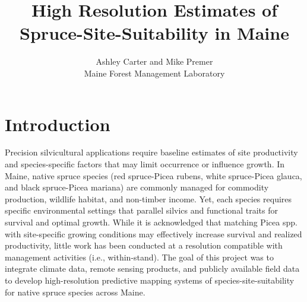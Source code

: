 \documentclass[9pt, twocolumn]{article}
\begin{document}
	\title{High Resolution Estimates of Spruce-Site-Suitability in Maine}
	\author{Ashley Carter and Mike Premer \\
		Maine Forest Management Laboratory\\}

\maketitle
\section{Introduction}
Precision silvicultural applications require baseline estimates of site productivity and species-specific factors that may limit occurrence or influence growth. In Maine, native spruce species (red spruce-Picea rubens, white spruce-Picea glauca, and black spruce-Picea mariana) are commonly managed for commodity production, wildlife habitat, and non-timber income. Yet, each species requires specific environmental settings that parallel silvics and functional traits for survival and optimal growth. While it is acknowledged that matching Picea spp. with site-specific growing conditions may effectively increase survival and realized productivity, little work has been conducted at a resolution compatible with management activities (i.e., within-stand). The goal of this project was to integrate climate data, remote sensing products, and publicly available field data to develop high-resolution predictive mapping systems of species-site-suitability for native spruce species across Maine. 
\end{document}
